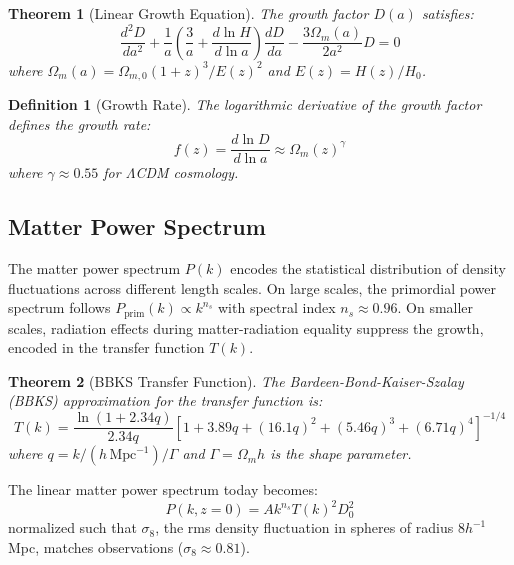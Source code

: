 \documentclass[a4paper, 11pt]{article}
\newtheorem{definition}{Definition}[section]
\newtheorem{theorem}{Theorem}[section]
\begin{document}
\begin{theorem}[Linear Growth Equation]
The growth factor $D(a)$ satisfies:
\begin{equation}
\frac{d^2 D}{da^2} + \frac{1}{a}\left(\frac{3}{a} + \frac{d\ln H}{d\ln a}\right)\frac{dD}{da}
- \frac{3\Omega_m(a)}{2a^2} D = 0
\end{equation}
where $\Omega_m(a) = \Omega_{m,0}(1+z)^3 / E(z)^2$ and $E(z) = H(z)/H_0$.
\end{theorem}

\begin{definition}[Growth Rate]
The logarithmic derivative of the growth factor defines the growth rate:
\begin{equation}
f(z) = \frac{d \ln D}{d \ln a} \approx \Omega_m(z)^{\gamma}
\end{equation}
where $\gamma \approx 0.55$ for $\Lambda$CDM cosmology.
\end{definition}

\subsection{Matter Power Spectrum}

The matter power spectrum $P(k)$ encodes the statistical distribution of density fluctuations
across different length scales. On large scales, the primordial power spectrum follows
$P_{\text{prim}}(k) \propto k^{n_s}$ with spectral index $n_s \approx 0.96$. On smaller scales,
radiation effects during matter-radiation equality suppress the growth, encoded in the transfer
function $T(k)$.

\begin{theorem}[BBKS Transfer Function]
The Bardeen-Bond-Kaiser-Szalay (BBKS) approximation for the transfer function is:
\begin{equation}
T(k) = \frac{\ln(1 + 2.34q)}{2.34q}\left[1 + 3.89q + (16.1q)^2 + (5.46q)^3 + (6.71q)^4\right]^{-1/4}
\end{equation}
where $q = k/(h\,\text{Mpc}^{-1}) / \Gamma$ and $\Gamma = \Omega_m h$ is the shape parameter.
\end{theorem}

The linear matter power spectrum today becomes:
\begin{equation}
P(k, z=0) = A k^{n_s} T(k)^2 D_0^2
\end{equation}
normalized such that $\sigma_8$, the rms density fluctuation in spheres of radius $8h^{-1}$ Mpc,
matches observations ($\sigma_8 \approx 0.81$).
\end{document}
